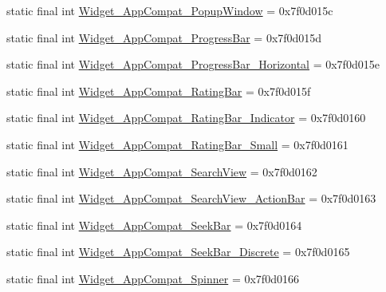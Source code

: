 \begin{DoxyCompactItemize}
\item 
static final int \mbox{\hyperlink{classandroid_1_1support_1_1v7_1_1appcompat_1_1_r_1_1style_a33aca1a50cb4c38c4446ba6812d92650}{Widget\+\_\+\+App\+Compat\+\_\+\+Popup\+Window}} = 0x7f0d015c
\item 
static final int \mbox{\hyperlink{classandroid_1_1support_1_1v7_1_1appcompat_1_1_r_1_1style_ab390a7d95b35ab9e44076a85e154b7f3}{Widget\+\_\+\+App\+Compat\+\_\+\+Progress\+Bar}} = 0x7f0d015d
\item 
static final int \mbox{\hyperlink{classandroid_1_1support_1_1v7_1_1appcompat_1_1_r_1_1style_a2199021cd967c56ad7d210cf7f9b7954}{Widget\+\_\+\+App\+Compat\+\_\+\+Progress\+Bar\+\_\+\+Horizontal}} = 0x7f0d015e
\item 
static final int \mbox{\hyperlink{classandroid_1_1support_1_1v7_1_1appcompat_1_1_r_1_1style_a3162c72dc44f36cd6cc9874a45606128}{Widget\+\_\+\+App\+Compat\+\_\+\+Rating\+Bar}} = 0x7f0d015f
\item 
static final int \mbox{\hyperlink{classandroid_1_1support_1_1v7_1_1appcompat_1_1_r_1_1style_a4e630a9181d7e7c7102763f465ede0ed}{Widget\+\_\+\+App\+Compat\+\_\+\+Rating\+Bar\+\_\+\+Indicator}} = 0x7f0d0160
\item 
static final int \mbox{\hyperlink{classandroid_1_1support_1_1v7_1_1appcompat_1_1_r_1_1style_a1c763de27988dced0b144631166a4461}{Widget\+\_\+\+App\+Compat\+\_\+\+Rating\+Bar\+\_\+\+Small}} = 0x7f0d0161
\item 
static final int \mbox{\hyperlink{classandroid_1_1support_1_1v7_1_1appcompat_1_1_r_1_1style_a0b9debe2b59a9eced1c10518295bd0a8}{Widget\+\_\+\+App\+Compat\+\_\+\+Search\+View}} = 0x7f0d0162
\item 
static final int \mbox{\hyperlink{classandroid_1_1support_1_1v7_1_1appcompat_1_1_r_1_1style_a30aafb9867d041573f7441a2cc5508b0}{Widget\+\_\+\+App\+Compat\+\_\+\+Search\+View\+\_\+\+Action\+Bar}} = 0x7f0d0163
\item 
static final int \mbox{\hyperlink{classandroid_1_1support_1_1v7_1_1appcompat_1_1_r_1_1style_a0fdbb17c1225846598a112c9be4ed827}{Widget\+\_\+\+App\+Compat\+\_\+\+Seek\+Bar}} = 0x7f0d0164
\item 
static final int \mbox{\hyperlink{classandroid_1_1support_1_1v7_1_1appcompat_1_1_r_1_1style_ad2c239017b173840245dee18a0f012ae}{Widget\+\_\+\+App\+Compat\+\_\+\+Seek\+Bar\+\_\+\+Discrete}} = 0x7f0d0165
\item 
static final int \mbox{\hyperlink{classandroid_1_1support_1_1v7_1_1appcompat_1_1_r_1_1style_af170a0011c6171b97922217fd714bfdb}{Widget\+\_\+\+App\+Compat\+\_\+\+Spinner}} = 0x7f0d0166

\end{DoxyCompactItemize}
